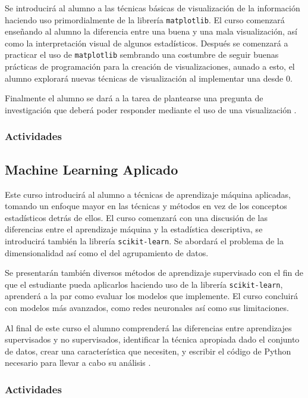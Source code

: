 \documentclass{article}
\begin{document}
            Se introducirá al alumno a las técnicas básicas de visualización de la información haciendo uso primordialmente de la librería \texttt{matplotlib}. El curso comenzará enseñando al alumno la diferencia entre una buena y una mala visualización, así como la interpretación visual de algunos estadísticos. Después se comenzará a practicar el uso de \texttt{matplotlib} sembrando una costumbre de seguir buenas prácticas de programación para la creación de visualizaciones, aunado a esto, el alumno explorará nuevas técnicas de visualización al implementar una desde 0. 
            
            Finalmente el alumno se dará a la tarea de plantearse una pregunta de investigación que deberá poder responder mediante el uso de una visualización \cite{plotting}.

            \subsubsection{Actividades}

        \subsection{Machine Learning Aplicado}

            Este curso introducirá al alumno a técnicas de aprendizaje máquina aplicadas, tomando un enfoque mayor en las técnicas y métodos en vez de los conceptos estadísticos detrás de ellos. El curso comenzará con una discusión de las diferencias entre el aprendizaje máquina y la estadística descriptiva, se introducirá también la librería \texttt{scikit-learn}. Se abordará el problema de la dimensionalidad así como el del agrupamiento de datos.

            Se presentarán también diversos métodos de aprendizaje supervisado con el fin de que el estudiante pueda aplicarlos haciendo uso de la librería \texttt{scikit-learn}, aprenderá a la par como evaluar los modelos que implemente. El curso concluirá con modelos más avanzados, como redes neuronales así como sus limitaciones.

            Al final de este curso el alumno comprenderá las diferencias entre aprendizajes supervisados y no supervisados, identificar la técnica apropiada dado el conjunto de datos, crear una característica que necesiten, y escribir el código de Python necesario para llevar a cabo su análisis \cite{applied-ml}.

            \subsubsection{Actividades}
\end{document}
